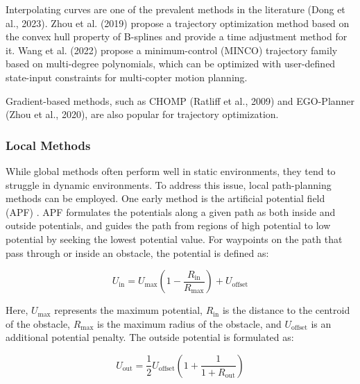 Interpolating curves are one of the prevalent methods in the literature (Dong et al., 2023). Zhou et al. (2019) propose a trajectory optimization method based on the convex hull property of B-splines and provide a time adjustment method for it. Wang et al. (2022) propose a minimum-control (MINCO) trajectory family based on multi-degree polynomials, which can be optimized with user-defined state-input constraints for multi-copter motion planning.

Gradient-based methods, such as CHOMP (Ratliff et al., 2009) and EGO-Planner (Zhou et al., 2020), are also popular for trajectory optimization.\subsubsection{Local Methods}
While global methods often perform well in static environments, they tend to struggle in dynamic environments. To address this issue, local path-planning methods can be employed. One early method is the artificial potential field (APF) \cite{warren1989global}. APF formulates the potentials along a given path as both inside and outside potentials, and guides the path from regions of high potential to low potential by seeking the lowest potential value. For waypoints on the path that pass through or inside an obstacle, the potential is defined as:

\begin{equation}
\label{eq:APF_in}
U_{\text{in}} = 
U_{\text{max}}(1 - \frac{R_{\text{in}}}{R_{\text{max}}}) + 
U_{\text{offset}}
\end{equation}

Here, $U_{\text{max}}$ represents the maximum potential, $R_{\text{in}}$ is the distance to the centroid of the obstacle, $R_{\text{max}}$ is the maximum radius of the obstacle, and $U_{\text{offset}}$ is an additional potential penalty. The outside potential is formulated as:

\begin{equation}
\label{eq:APF_out}
U_{\text{out}} = 
\frac{1}{2}U_{\text{offset}}(1+ \frac{1}{1+R_\text{out}})
\end{equation}

